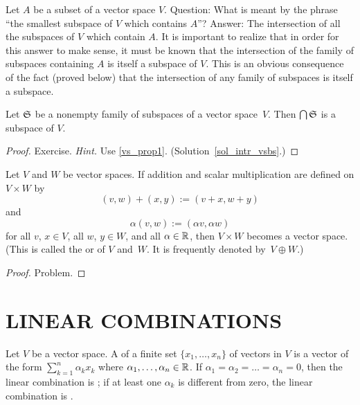 Let $A$ be a subset of a vector space $V$.  Question: What is meant by the phrase ``the
smallest subspace of $V$ which contains $A$''? Answer: The intersection of all the subspaces
of $V$ which contain $A$.  It is important to realize that in order for this answer to make
sense, it must be known that the intersection of the family of subspaces containing $A$ is
itself a subspace of $V$.  This is an obvious consequence of the fact (proved below) that the
intersection of any family of subspaces is itself a subspace.

\begin{prop}\label{intr_vsbs} Let $\mathfrak{S}$ be a nonempty family of subspaces of a vector
space~$V$. Then $\bigcap \mathfrak{S}$ is a subspace of $V$.
\end{prop}

\begin{proof} Exercise. \emph{Hint.} Use \ref{vs_prop1}.  (Solution~\ref{sol_intr_vsbs}.) \ns
\end{proof}

\begin{exam}\label{prod_vs} Let $V$ and $W$ be vector spaces.  If addition and scalar multiplication
are defined on $V \times W$ by
  \[ (v,w) + (x,y) := (v+x,w+y) \]
and
  \[ \alpha(v,w) := (\alpha v, \alpha w) \]
for all $v$, $x \in V$, all $w$, $y \in W$, and all $\alpha \in \mathbb{R}$, then $V \times W$ becomes
a vector space. (This is called the
 or
 of $V$ and~$W$.  It is frequently denoted
by~$V \oplus W$.)
\end{exam}

\begin{proof} Problem.  \ns  \end{proof}








\section{LINEAR COMBINATIONS}
\begin{defn} Let $V$ be a vector space. A
 of a finite set $\{x_1, \dots, x_n\}$ of vectors in $V$ is a vector of
the form $\sum_{k=1}^n \alpha_k x_k$ where $\alpha_1, \dots, \alpha_n \in \mathbb{R}$.  If $\alpha_1 =
\alpha_2 = \dots = \alpha_n = 0$, then the linear combination is ; if at least one
$\alpha_k$ is different from zero, the linear combination is .
\end{defn}

